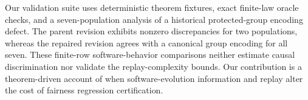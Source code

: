 \begin{titlepage}
\begin{minipage}{0.92\textwidth}
Our validation suite uses deterministic theorem fixtures, exact finite-law oracle checks, and a seven-population analysis of a historical protected-group encoding defect. The parent revision exhibits nonzero discrepancies for two populations, whereas the repaired revision agrees with a canonical group encoding for all seven. These finite-row software-behavior comparisons neither estimate causal discrimination nor validate the replay-complexity bounds. Our contribution is a theorem-driven account of when software-evolution information and replay alter the cost of fairness regression certification.
\end{minipage}
\vfill
\end{titlepage}
